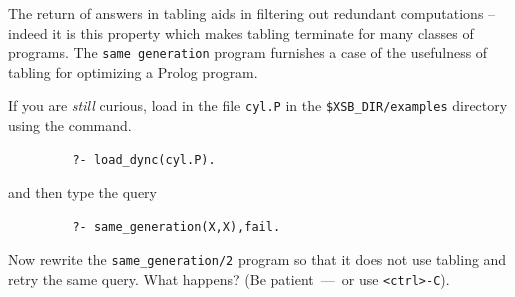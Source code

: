 The return of answers in tabling aids in filtering out redundant
computations -- indeed it is this property which makes tabling
terminate for many classes of programs.  The {\tt same generation}
program furnishes a case of the usefulness of tabling for optimizing a
Prolog program.

\begin{exercise} \label{ex:samegen}
If you are {\em still} curious, load in the file {\tt cyl.P} in the
\verb|$XSB_DIR/examples| directory using the command.  %
\begin{verbatim}
         ?- load_dync(cyl.P).
\end{verbatim}
and then type the query
\begin{verbatim}
         ?- same_generation(X,X),fail.
\end{verbatim}
Now rewrite the {\tt same\_generation/2} program so that it does not
use tabling and retry the same query.  What happens?  (Be
patient~---~or use \verb|<ctrl>-C|).\fillBox
\end{exercise}

